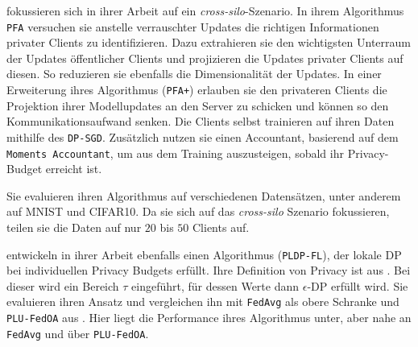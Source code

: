 \textcite{liu:2021} fokussieren sich in ihrer Arbeit auf ein \textit{cross-silo}-Szenario. In ihrem Algorithmus \texttt{PFA} versuchen sie anstelle verrauschter Updates die \glqq{}richtigen\grqq{} Informationen privater Clients zu identifizieren. Dazu extrahieren sie den wichtigsten Unterraum der Updates öffentlicher Clients und projizieren die Updates privater Clients auf diesen. So reduzieren sie ebenfalls die Dimensionalität der Updates. In einer Erweiterung ihres Algorithmus (\texttt{PFA+}) erlauben sie den privateren Clients die Projektion ihrer Modellupdates an den Server zu schicken und können so den Kommunikationsaufwand senken. Die Clients selbst trainieren auf ihren Daten mithilfe des \texttt{DP-SGD}\cite{abadi:2016}. Zusätzlich nutzen sie einen Accountant, basierend auf dem \texttt{Moments Accountant}, um aus dem Training auszusteigen, sobald ihr Privacy-Budget erreicht ist.

Sie evaluieren ihren Algorithmus auf verschiedenen Datensätzen, unter anderem auf MNIST und CIFAR10. Da sie sich auf das \textit{cross-silo} Szenario fokussieren, teilen sie die Daten auf nur $20$ bis $50$ Clients auf.

\textcite{shen:2023} entwickeln in ihrer Arbeit ebenfalls einen Algorithmus (\texttt{PLDP-FL}), der lokale DP bei individuellen Privacy Budgets erfüllt. Ihre Definition von Privacy ist aus \textcite{chen:2016}. Bei dieser wird ein Bereich $\tau$ eingeführt, für dessen Werte dann $\epsilon$-DP erfüllt wird. Sie evaluieren ihren Ansatz und vergleichen ihn mit \texttt{FedAvg} \parencite{mcmahan:2016} als obere Schranke und \texttt{PLU-FedOA} aus \textcite{yang:2021}. Hier liegt die Performance ihres Algorithmus unter, aber nahe an \texttt{FedAvg} und über \texttt{PLU-FedOA}. 